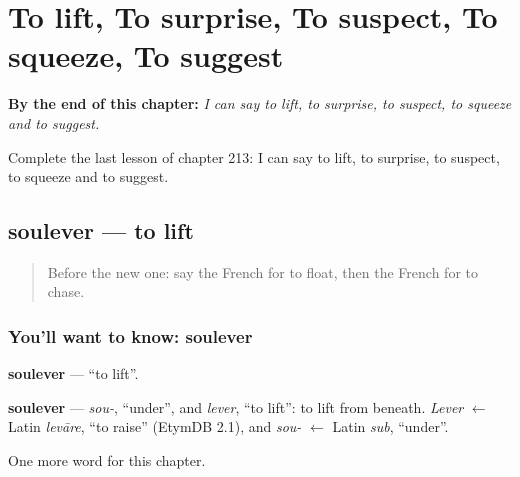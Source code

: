 
\chapter{To lift, To surprise, To suspect, To squeeze, To suggest}
\label{ch:fr-to-lift-to-surprise-to-suspect-to-squeeze-to-suggest}

\begin{chapteropening}
\textbf{By the end of this chapter:} \emph{I can say to lift, to surprise, to suspect, to squeeze and to suggest.}

Complete the last lesson of chapter 213: I can say to lift, to surprise, to suspect, to squeeze and to suggest.
\end{chapteropening}

\section[soulever]{soulever — to lift}

\label{lesson:FR-C213-soulever}



\begin{quote}
Before the new one: say the French for to float, then the French for to chase.
\end{quote}

\subsection*{You'll want to know: soulever}
\textbf{soulever} — \textquotedblleft{}to lift\textquotedblright{}.

\begin{cousinweb}
\textbf{soulever} — \emph{sou-}, \textquotedblleft{}under\textquotedblright{}, and \emph{lever}, \textquotedblleft{}to lift\textquotedblright{}: to lift from beneath. \emph{Lever} $\leftarrow$ Latin \emph{levāre}, \textquotedblleft{}to raise\textquotedblright{} (EtymDB 2.1), and \emph{sou-} $\leftarrow$ Latin \emph{sub}, \textquotedblleft{}under\textquotedblright{}.
\end{cousinweb}

\begin{grammarlens}[title={What you've built}]
One more word for this chapter.
\end{grammarlens}

